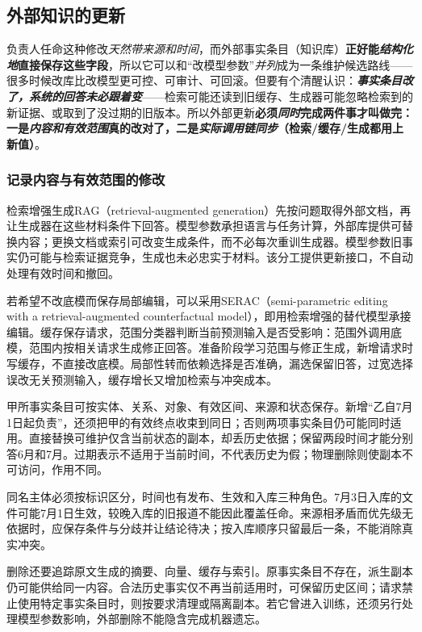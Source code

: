 \subsection{外部知识的更新}
\label{sec:ket-update-external}

负责人任命这种修改\emph{天然带来源和时间}，而外部事实条目（知识库）\textbf{正好能\emph{结构化地}直接保存这些字段}，所以它可以和“改模型参数”\emph{并列}成为一条维护候选路线——很多时候改库比改模型更可控、可审计、可回滚。但要有个清醒认识：\textbf{\emph{事实条目改了，系统的回答\emph{未必}跟着变}}——检索可能还读到旧缓存、生成器可能忽略检索到的新证据、或取到了没过期的旧版本。所以外部更新\textbf{必须\emph{同时}完成两件事才叫做完：一是\emph{内容和有效范围}真的改对了，二是\emph{实际调用链\emph{同步}}（检索/缓存/生成都用上新值）}。

\subsubsection{记录内容与有效范围的修改}
\label{sec:ket-update-records}

检索增强生成RAG（retrieval-augmented generation）先按问题取得外部文档，再让生成器在这些材料条件下回答。模型参数承担语言与任务计算，外部库提供可替换内容；更换文档或索引可改变生成条件，而不必每次重训生成器。模型参数旧事实仍可能与检索证据竞争，生成也未必忠实于材料。该分工提供更新接口，不自动处理有效时间和撤回。

若希望不改底模而保存局部编辑，可以采用SERAC（semi-parametric editing with a retrieval-augmented counterfactual model），即用检索增强的替代模型承接编辑。缓存保存请求，范围分类器判断当前预测输入是否受影响：范围外调用底模，范围内按相关请求生成修正回答。准备阶段学习范围与修正生成，新增请求时写缓存，不直接改底模。局部性转而依赖选择是否准确，漏选保留旧答，过宽选择误改无关预测输入，缓存增长又增加检索与冲突成本。

甲所事实条目可按实体、关系、对象、有效区间、来源和状态保存。新增“乙自7月1日起负责”，还须把甲的有效终点收束到同日；否则两项事实条目仍可能同时适用。直接替换可维护仅含当前状态的副本，却丢历史依据；保留两段时间才能分别答6月和7月。过期表示不适用于当前时间，不代表历史为假；物理删除则使副本不可访问，作用不同。

同名主体必须按标识区分，时间也有发布、生效和入库三种角色。7月3日入库的文件可能7月1日生效，较晚入库的旧报道不能因此覆盖任命。来源相矛盾而优先级无依据时，应保存条件与分歧并让结论待决；按入库顺序只留最后一条，不能消除真实冲突。

删除还要追踪原文生成的摘要、向量、缓存与索引。原事实条目不存在，派生副本仍可能供给同一内容。合法历史事实仅不再当前适用时，可保留历史区间；请求禁止使用特定事实条目时，则按要求清理或隔离副本。若它曾进入训练，还须另行处理模型参数影响，外部删除不能隐含完成机器遗忘。

